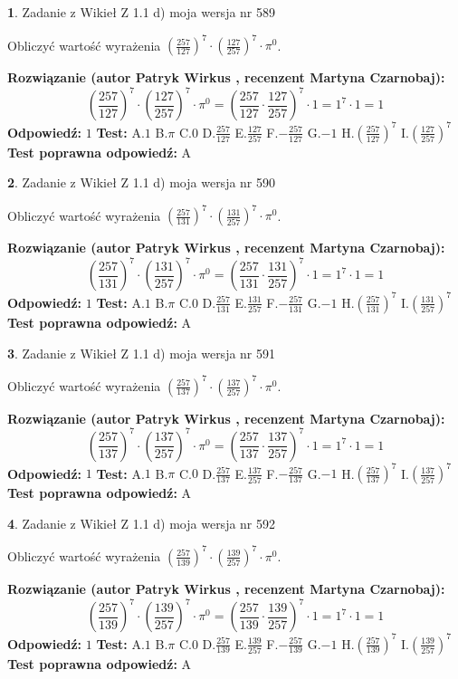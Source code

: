 \documentclass[12pt, a4paper]{article}
\theoremstyle{definition} %
\newtheorem{zad}{}
\newcommand{\zadStart}[1]{\begin{zad}#1\newline}
\newcommand{\zadStop}{\end{zad}}
\newcommand{\rozwStart}[2]{\noindent \textbf{Rozwiązanie (autor #1 , recenzent #2): }\newline}
\newcommand{\rozwStop}{\newline}
\newcommand{\odpStart}{\noindent \textbf{Odpowiedź:}\newline}
\newcommand{\odpStop}{\newline}
\newcommand{\testStart}{\noindent \textbf{Test:}\newline}
\newcommand{\testStop}{\newline}
\newcommand{\kluczStart}{\noindent \textbf{Test poprawna odpowiedź:}\newline}
\newcommand{\kluczStop}{\newline}
\begin{document}
\zadStart{Zadanie z Wikieł Z 1.1 d) moja wersja nr 589}

Obliczyć wartość wyrażenia $(\frac{257}{127})^{7} \cdot (\frac{127}{257})^{7} \cdot \pi^{0}$.
\zadStop
\rozwStart{Patryk Wirkus}{Martyna Czarnobaj}
$$(\frac{257}{127})^{7} \cdot (\frac{127}{257})^{7} \cdot \pi^{0} = (\frac{257}{127} \cdot \frac{127}{257})^{7} \cdot 1 = 1^{7} \cdot 1 = 1$$
\rozwStop
\odpStart
$1$
\odpStop
\testStart
A.$1$ B.$\pi$ C.$0$ D.$\frac{257}{127}$ E.$\frac{127}{257}$
F.$-\frac{257}{127}$ G.$-1$
H.$(\frac{257}{127})^{7}$
I.$(\frac{127}{257})^{7}$
\testStop
\kluczStart
A
\kluczStop



\zadStart{Zadanie z Wikieł Z 1.1 d) moja wersja nr 590}

Obliczyć wartość wyrażenia $(\frac{257}{131})^{7} \cdot (\frac{131}{257})^{7} \cdot \pi^{0}$.
\zadStop
\rozwStart{Patryk Wirkus}{Martyna Czarnobaj}
$$(\frac{257}{131})^{7} \cdot (\frac{131}{257})^{7} \cdot \pi^{0} = (\frac{257}{131} \cdot \frac{131}{257})^{7} \cdot 1 = 1^{7} \cdot 1 = 1$$
\rozwStop
\odpStart
$1$
\odpStop
\testStart
A.$1$ B.$\pi$ C.$0$ D.$\frac{257}{131}$ E.$\frac{131}{257}$
F.$-\frac{257}{131}$ G.$-1$
H.$(\frac{257}{131})^{7}$
I.$(\frac{131}{257})^{7}$
\testStop
\kluczStart
A
\kluczStop



\zadStart{Zadanie z Wikieł Z 1.1 d) moja wersja nr 591}

Obliczyć wartość wyrażenia $(\frac{257}{137})^{7} \cdot (\frac{137}{257})^{7} \cdot \pi^{0}$.
\zadStop
\rozwStart{Patryk Wirkus}{Martyna Czarnobaj}
$$(\frac{257}{137})^{7} \cdot (\frac{137}{257})^{7} \cdot \pi^{0} = (\frac{257}{137} \cdot \frac{137}{257})^{7} \cdot 1 = 1^{7} \cdot 1 = 1$$
\rozwStop
\odpStart
$1$
\odpStop
\testStart
A.$1$ B.$\pi$ C.$0$ D.$\frac{257}{137}$ E.$\frac{137}{257}$
F.$-\frac{257}{137}$ G.$-1$
H.$(\frac{257}{137})^{7}$
I.$(\frac{137}{257})^{7}$
\testStop
\kluczStart
A
\kluczStop



\zadStart{Zadanie z Wikieł Z 1.1 d) moja wersja nr 592}

Obliczyć wartość wyrażenia $(\frac{257}{139})^{7} \cdot (\frac{139}{257})^{7} \cdot \pi^{0}$.
\zadStop
\rozwStart{Patryk Wirkus}{Martyna Czarnobaj}
$$(\frac{257}{139})^{7} \cdot (\frac{139}{257})^{7} \cdot \pi^{0} = (\frac{257}{139} \cdot \frac{139}{257})^{7} \cdot 1 = 1^{7} \cdot 1 = 1$$
\rozwStop
\odpStart
$1$
\odpStop
\testStart
A.$1$ B.$\pi$ C.$0$ D.$\frac{257}{139}$ E.$\frac{139}{257}$
F.$-\frac{257}{139}$ G.$-1$
H.$(\frac{257}{139})^{7}$
I.$(\frac{139}{257})^{7}$
\testStop
\kluczStart
A
\kluczStop
\end{document}
